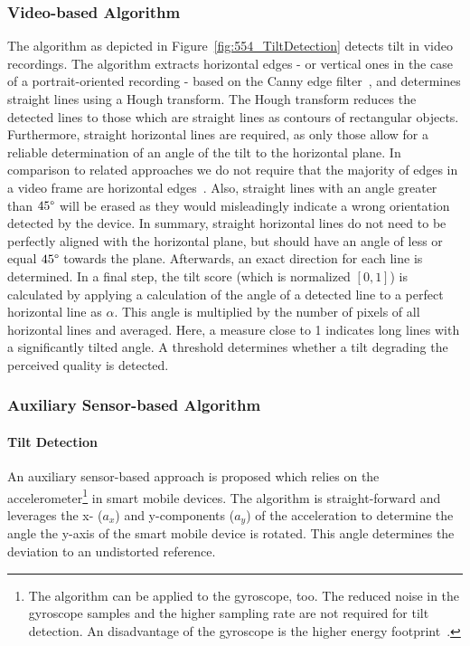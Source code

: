 \subsubsection{Video-based Algorithm}
The algorithm as depicted in Figure~\ref{fig:554_TiltDetection} detects tilt in video recordings.
The algorithm extracts horizontal edges - or vertical ones in the case of a portrait-oriented recording - based on the Canny edge filter~\cite{Canny1986}, and determines straight lines using a Hough transform.
The Hough transform reduces the detected lines to those which are straight lines as contours of rectangular objects. 
Furthermore, straight horizontal lines are required, as only those allow for a reliable determination of an angle of the tilt to the horizontal plane.
In comparison to related approaches we do not require that the majority of edges in a video frame are horizontal edges~\cite{Saini2012}. 
Also, straight lines with an angle greater than $45\degree$ will be erased as they would misleadingly indicate a wrong orientation detected by the device.
In summary, straight horizontal lines do not need to be perfectly aligned with the horizontal plane, but should have an angle of less or equal $45\degree$ towards the plane.
Afterwards, an exact direction for each line is determined. 
In a final step, the tilt score (which is normalized $[0,1]$) is calculated by applying a calculation of the angle of a detected line to a perfect horizontal line as $\alpha$.
This angle is multiplied by the number of pixels of all horizontal lines and averaged.
Here, a measure close to 1 indicates long lines with a significantly tilted angle.
A threshold determines whether a tilt degrading the perceived quality is detected.
\subsubsection{Auxiliary Sensor-based Algorithm}
\paragraph{Tilt Detection}
An auxiliary sensor-based approach is proposed which relies on the accelerometer\footnote{The algorithm can be applied to the gyroscope, too. The reduced noise in the gyroscope samples and the higher sampling rate are not required for tilt detection. An disadvantage of the gyroscope is the higher energy footprint~\protect\cite{Koenig2013}.} in smart mobile devices.
The algorithm is straight-forward and leverages the x- ($a_x$) and y-components ($a_y$) of the acceleration to determine the angle the y-axis of the smart mobile device is rotated.
This angle determines the deviation to an undistorted reference.

